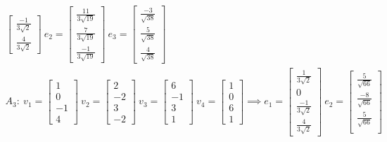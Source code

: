 \begin{gather*}
\begin{bmatrix}
        \frac{-1}{3\sqrt{2}}\\
        \frac{4}{3\sqrt{2}} 
    \end{bmatrix}
    ~ e_2 = \begin{bmatrix}
        \frac{11}{3\sqrt{19}}\\
        \frac{7}{3\sqrt{19}}\\
        \frac{-1}{3\sqrt{19}} 
    \end{bmatrix}
    ~ e_3 = \begin{bmatrix}
        \frac{-3}{\sqrt{38}}\\
        \frac{5}{\sqrt{38}}\\
        \frac{4}{\sqrt{38}} 
    \end{bmatrix}
    \\
    A_3:~
    v_1 = \begin{bmatrix}
        1\\
        0\\
        -1\\
        4 
    \end{bmatrix}
    ~ v_2 = \begin{bmatrix}
        2\\
        -2\\
        3\\
        -2  
    \end{bmatrix}
    ~ v_3 = \begin{bmatrix}
        6\\
        -1\\
        3\\
        1 
    \end{bmatrix}
    ~ v_4 = \begin{bmatrix}
        1\\
        0\\
        6\\
        1 
    \end{bmatrix}
    \implies
    e_1 = \begin{bmatrix}
        \frac{1}{3\sqrt{2}}\\
        0\\
        \frac{-1}{3\sqrt{2}}\\
        \frac{4}{3\sqrt{2}}
    \end{bmatrix}
    ~ e_2 = \begin{bmatrix}
        \frac{5}{\sqrt{66}}\\
        \frac{-8}{\sqrt{66}}\\
        \frac{5}{\sqrt{66}}\\

\end{bmatrix}
\end{gather*}
